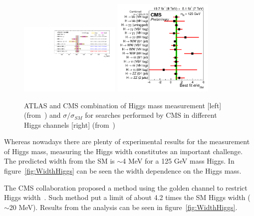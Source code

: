 \begin{figure}[!Hhtbp]
  \begin{center}
    \includegraphics[trim=10cm 7cm 1cm 1cm, clip=true, width=0.43\textwidth]{figs/LHC_combined_obs_unblind_summary_a1_final.png}
    \includegraphics[width=0.43\textwidth]{figs/sqr_mlz_ccc_mH125.png}
    \caption{ATLAS and CMS combination of Higgs mass measurement [left] (from~\cite{Aad:2015zhl}) and $\sigma/\sigma_{SM}$ for searches performed by CMS in different Higgs channels [right] (from~\cite{CMS:2014ega})}
    \label{fig:HiggsMass}
  \end{center}
\end{figure}

Whereas nowadays there are plenty of experimental results for the measurement of Higgs mass, measuring the Higgs width constitutes an important challenge. The predicted width from the SM is $\sim$4 MeV for a 125 GeV mass Higgs. In figure~\ref{fig:WidthHiggs} can be seen the width dependence on the Higgs mass. 

The CMS collaboration proposed a method using the golden channel to restrict Higgs width~\cite{CMS-PAS-HIG-14-002, Khachatryan:2014iha}. Such method put a limit of about 4.2 times the SM Higgs width ($\sim$20 MeV). Results from the analysis can be seen in figure~\ref{fig:WidthHiggs}.


